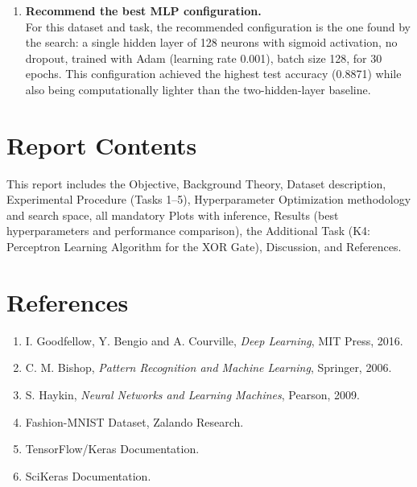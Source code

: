\documentclass[11pt]{article}
\begin{document}
\begin{enumerate}[label=\arabic*.]
\item \textbf{Recommend the best MLP configuration.}\\
For this dataset and task, the recommended configuration is the one found by
the search: a single hidden layer of 128 neurons with sigmoid activation, no
dropout, trained with Adam (learning rate 0.001), batch size 128, for 30
epochs. This configuration achieved the highest test accuracy (0.8871) while
also being computationally lighter than the two-hidden-layer baseline.

\end{enumerate}

\section{Report Contents}
This report includes the Objective, Background Theory, Dataset description,
Experimental Procedure (Tasks 1--5), Hyperparameter Optimization methodology
and search space, all mandatory Plots with inference, Results (best
hyperparameters and performance comparison), the Additional Task (K4:
Perceptron Learning Algorithm for the XOR Gate), Discussion, and References.

\section{References}
\begin{enumerate}[label=\arabic*.]
    \item I. Goodfellow, Y. Bengio and A. Courville, \textit{Deep Learning}, MIT Press, 2016.
    \item C. M. Bishop, \textit{Pattern Recognition and Machine Learning}, Springer, 2006.
    \item S. Haykin, \textit{Neural Networks and Learning Machines}, Pearson, 2009.
    \item Fashion-MNIST Dataset, Zalando Research.
    \item TensorFlow/Keras Documentation.
    \item SciKeras Documentation.
\end{enumerate}
\end{document}
